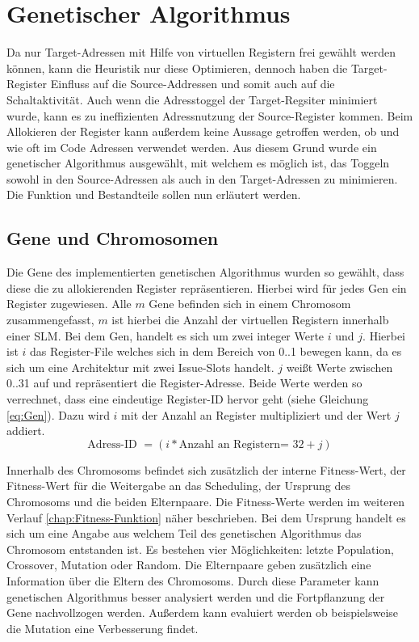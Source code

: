 \section{Genetischer Algorithmus}
\label{sec:genetischerAlgorithmus}
Da nur Target-Adressen mit Hilfe von virtuellen Registern frei gewählt werden können, kann die Heuristik nur diese Optimieren, dennoch haben die Target-Register Einfluss auf die Source-Addressen und somit auch auf die Schaltaktivität. Auch wenn die Adresstoggel der Target-Regsiter minimiert wurde, kann es zu ineffizienten Adressnutzung der Source-Register kommen. Beim Allokieren der Register kann außerdem keine Aussage getroffen werden, ob und wie oft im Code Adressen verwendet werden. Aus diesem Grund wurde ein genetischer Algorithmus ausgewählt, mit welchem es möglich ist, das Toggeln sowohl in den Source-Adressen als auch in den Target-Adressen zu minimieren. Die Funktion und Bestandteile sollen nun erläutert werden.

\subsection{Gene und Chromosomen}
Die Gene des implementierten genetischen Algorithmus wurden so gewählt, dass diese die zu allokierenden Register repräsentieren. Hierbei wird für jedes Gen ein Register zugewiesen.
Alle $m$ Gene befinden sich in einem Chromosom zusammengefasst, $m$ ist hierbei die Anzahl der virtuellen Registern innerhalb einer SLM. Bei dem Gen, handelt es sich um zwei integer Werte $i$ und $j$. Hierbei ist $i$ das Register-File welches sich in dem Bereich von 0..1 bewegen kann, da es sich um eine Architektur mit zwei Issue-Slots handelt. $j$ weißt Werte zwischen 0..31 auf und repräsentiert die Register-Adresse. Beide Werte werden so verrechnet, dass eine eindeutige Register-ID hervor geht (siehe Gleichung \ref{eq:Gen}). Dazu wird $i$ mit der Anzahl an Register multipliziert und der Wert $j$ addiert. 
\begin{equation}
\text{Adress-ID }= (i* \text{Anzahl an Registern= 32}+ j)
\label{eq:Gen}
\end{equation}
 
 Innerhalb des Chromosoms befindet sich zusätzlich der interne Fitness-Wert, der Fitness-Wert für die Weitergabe an das Scheduling, der Ursprung des Chromosoms und die beiden Elternpaare. Die Fitness-Werte werden im weiteren Verlauf \ref{chap:Fitness-Funktion} näher beschrieben. Bei dem Ursprung handelt es sich um eine Angabe aus welchem Teil des genetischen Algorithmus das Chromosom entstanden ist. Es bestehen vier Möglichkeiten: letzte Population, Crossover, Mutation oder Random. Die Elternpaare geben zusätzlich eine Information über die Eltern des Chromosoms. Durch diese Parameter kann genetischen Algorithmus besser analysiert werden und die Fortpflanzung der Gene nachvollzogen werden. Außerdem kann evaluiert werden ob beispielsweise die Mutation eine Verbesserung findet. 
  

